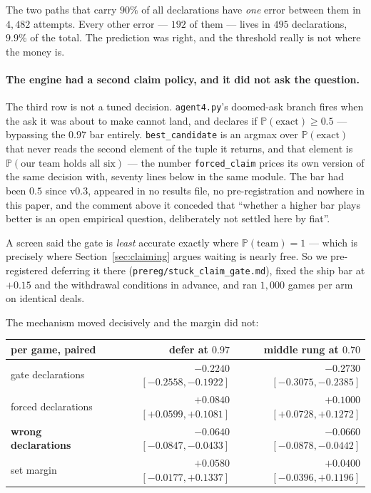 \documentclass[11pt,a4paper]{article}
\newcommand{\Prob}{\ensuremath{\mathbb{P}}}
\begin{document}
\noindent The two paths that carry $90\%$ of all declarations have \emph{one}
error between them in $4{,}482$ attempts. Every other error --- $192$ of them
--- lives in $495$ declarations, $9.9\%$ of the total. The prediction was
right, and the threshold really is not where the money is.

\paragraph{The engine had a second claim policy, and it did not ask the
question.} The third row is not a tuned decision. \texttt{agent4.py}'s
doomed-ask branch fires when the ask it was about to make cannot land, and
declares if $\Prob(\text{exact}) \geq 0.5$ --- bypassing the $0.97$ bar
entirely. \texttt{best\_candidate} is an argmax over $\Prob(\text{exact})$ that
never reads the second element of the tuple it returns, and that element is
$\Prob(\text{our team holds all six})$ --- the number \texttt{forced\_claim}
prices its own version of the same decision with, seventy lines below in the
same module. The bar had been $0.5$ since v0.3, appeared in no results file, no
pre-registration and nowhere in this paper, and the comment above it conceded
that ``whether a higher bar plays better is an open empirical question,
deliberately not settled here by fiat''.

A screen said the gate is \emph{least} accurate exactly where
$\Prob(\text{team}) = 1$ --- which is precisely where
Section~\ref{sec:claiming} argues waiting is nearly free. So we
pre-registered deferring it there (\texttt{prereg/stuck\_claim\_gate.md}),
fixed the ship bar at $+0.15$ and the withdrawal conditions in advance, and
ran $1{,}000$ games per arm on identical deals.

The mechanism moved decisively and the margin did not:

\begin{center}
\small
\begin{tabular}{lrr}
\toprule
per game, paired & defer at $0.97$ & middle rung at $0.70$ \\
\midrule
gate declarations & $-0.2240$ $[-0.2558, -0.1922]$ & $-0.2730$ $[-0.3075, -0.2385]$ \\
forced declarations & $+0.0840$ $[+0.0599, +0.1081]$ & $+0.1000$ $[+0.0728, +0.1272]$ \\
\textbf{wrong declarations} & $\mathbf{-0.0640}$ $[-0.0847, -0.0433]$ & $\mathbf{-0.0660}$ $[-0.0878, -0.0442]$ \\
\midrule
set margin & $+0.0580$ $[-0.0177, +0.1337]$ & $+0.0400$ $[-0.0396, +0.1196]$ \\
\bottomrule
\end{tabular}
\end{center}
\end{document}

